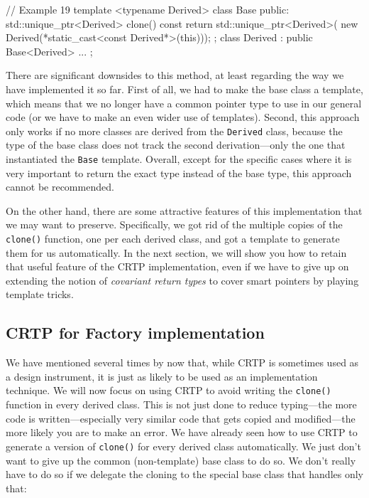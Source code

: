\begin{code}
// Example 19
template <typename Derived> class Base {
  public:
  std::unique_ptr<Derived> clone() const {
    return std::unique_ptr<Derived>(
      new Derived(*static_cast<const Derived*>(this)));
  }
};
class Derived : public Base<Derived> { ... };
\end{code}

There are significant downsides to this method, at least regarding the way we have implemented it so far. First of all, we had to make the base class a template, which means that we no longer have a common pointer type to use in our general code (or we have to make an even wider use of templates). Second, this approach only works if no more classes are derived from the \texttt{Derived} class, because the type of the base class does not track the second derivation---only the one that instantiated the \texttt{Base} template. Overall, except for the specific cases where it is very important to return the exact type instead of the base type, this approach cannot be recommended.

On the other hand, there are some attractive features of this implementation that we may want to preserve. Specifically, we got rid of the multiple copies of the \texttt{clone()} function, one per each derived class, and got a template to generate them for us automatically. In the next section, we will show you how to retain that useful feature of the CRTP implementation, even if we have to give up on extending the notion of \emph{covariant return types} to cover smart pointers by playing template tricks.

\subsection{CRTP for Factory implementation}

We have mentioned several times by now that, while CRTP is sometimes used as a design instrument, it is just as likely to be used as an implementation technique. We will now focus on using CRTP to avoid writing the \texttt{clone()} function in every derived class. This is not just done to reduce typing---the more code is written---especially very similar code that gets copied and modified---the more likely you are to make an error. We have already seen how to use CRTP to generate a version of \texttt{clone()} for every derived class automatically. We just don't want to give up the common (non-template) base class to do so. We don't really have to do so if we delegate the cloning to the special base class that handles only that:

